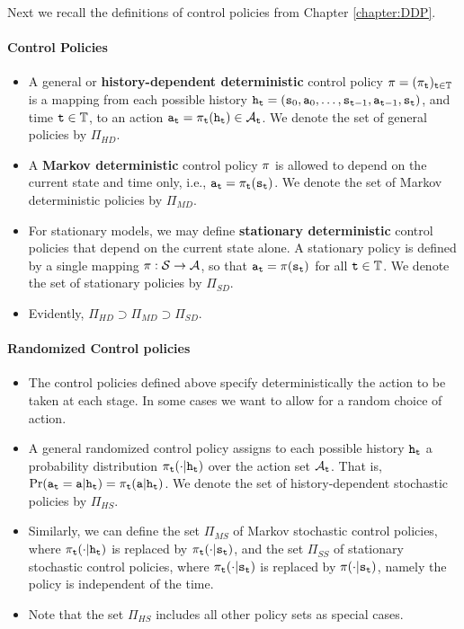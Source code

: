 Next we recall the definitions of control policies from Chapter \ref{chapter:DDP}.

\paragraph{Control Policies}
\begin{itemize}
  \item
A general or \textbf{history-dependent deterministic} control policy
$\pi  = {({\pi _{\tt t}})_{{\tt t} \in {\mathbb{T}}}}$ is a
mapping from each possible history ${{\tt h}_{\tt t}} =
({{\tt s}_0},{{\tt a}_0}, \ldots ,{{\tt s}_{{\tt t} -
1}},{{\tt a}_{{\tt t} - 1}},{{\tt s}_{\tt t}})$, and time ${\tt t} \in
\mathbb{T}$, to an action ${{\tt a}_{\tt t}} = {\pi
_{\tt t}}({{\tt h}_{\tt t}}) \in {\mathcal{A}_{\tt t}}$.  We denote the
set of general policies by ${\Pi _{HD}}$.
  \item
A \textbf{Markov deterministic} control policy $\pi $ is allowed
to depend on the current state and time only, i.e., ${{\tt a}_{\tt t}} =
{\pi _{\tt t}}({{\tt s}_{\tt t}})$.   We denote the set of Markov
deterministic policies by ${\Pi _{MD}}$.
  \item
For stationary models, we may define \textbf{stationary
deterministic} control policies that depend on the current state
alone. A stationary policy is defined by a single mapping $\pi
:\mathcal{S} \to \mathcal{A}$, so that  ${{\tt a}_{\tt t}} = \pi
({{\tt s}_{\tt t}})$ for all ${\tt t} \in {\ensuremath{\mathbb{T}}}$. We denote the set of
stationary policies by ${\Pi _{SD}}$.
  \item Evidently, ${\Pi_{HD}} \supset {\Pi_{MD}} \supset {\Pi_{SD}}$.
\end{itemize}

\paragraph{Randomized Control policies}
\begin{itemize}
  \item The control policies defined above specify deterministically the action to be taken at each stage. In some cases we want to allow for a random choice of action.
  \item A general randomized control policy assigns to each possible history ${{\tt h}_{\tt t}}$ a probability distribution ${\pi _{\tt t}}( \cdot |{{\tt h}_{\tt t}})$ over the action set ${\mathcal{A}_{\tt t}}$.
  That is,  $\Pr( {{\tt a}_{\tt t}} = {\tt a}|{{\tt h}_{\tt t}})  = {\pi _{\tt t}}({\tt a}|{{\tt h}_{\tt t}})$. We denote the set of history-dependent stochastic policies by ${\Pi _{HS}}$.
  \item Similarly, we can define the set ${\Pi _{MS}}$ of Markov stochastic control policies, where ${\pi _{\tt t}}( \cdot |{{\tt h}_{\tt t}})$ is replaced by ${\pi _{\tt t}}( \cdot |{{\tt s}_{\tt t}})$, and the set ${\Pi _{SS}}$ of stationary stochastic control policies, where ${\pi _{\tt t}}( \cdot |{{\tt s}_{\tt t}})$ is replaced by  $\pi ( \cdot
  |{{\tt s}_{\tt t}})$, namely the policy is independent of the time.
  \item Note that the set ${\Pi _{HS}}$ includes all other policy sets as special cases.
\end{itemize}

